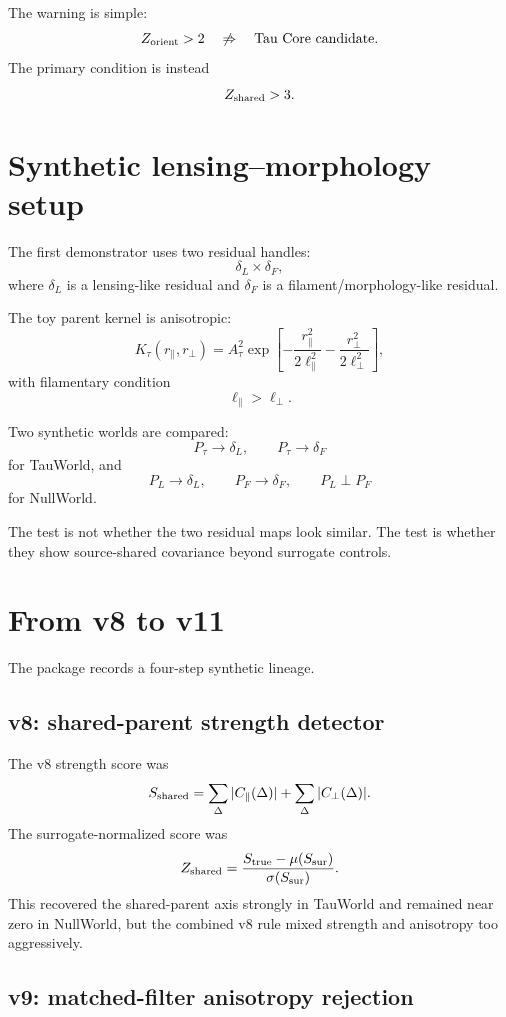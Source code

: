 \documentclass[12pt]{article}
\begin{document}
The warning is simple:
\[
  Z_{\rm orient}>2
  \quad\not\Rightarrow\quad
  \text{Tau Core candidate}.
\]
The primary condition is instead
\[
  Z_{\rm shared}>3.
\]

\section{Synthetic lensing--morphology setup}

The first demonstrator uses two residual handles:
\[
  \delta_L \times \delta_F,
\]
where \(\delta_L\) is a lensing-like residual and \(\delta_F\) is a
filament/morphology-like residual.

The toy parent kernel is anisotropic:
\[
  K_{\tau}(r_{\parallel},r_{\perp})
  =
  A_{\tau}^2
  \exp\left[
  -\frac{r_{\parallel}^2}{2\ell_{\parallel}^2}
  -\frac{r_{\perp}^2}{2\ell_{\perp}^2}
  \right],
  \label{eq:parent-kernel}
\]
with filamentary condition
\[
  \ell_{\parallel}>\ell_{\perp}.
\]

Two synthetic worlds are compared:
\[
  P_{\tau}\to\delta_L,\qquad P_{\tau}\to\delta_F
\]
for TauWorld, and
\[
  P_L\to\delta_L,\qquad P_F\to\delta_F,\qquad P_L\perp P_F
\]
for NullWorld.

The test is not whether the two residual maps look similar.  The test is
whether they show source-shared covariance beyond surrogate controls.

\section{From v8 to v11}

The package records a four-step synthetic lineage.

\subsection{v8: shared-parent strength detector}

The v8 strength score was
\[
  S_{\rm shared}
  =
  \sum_{\Delta}|C_{\parallel}(\Delta)|
  +
  \sum_{\Delta}|C_{\perp}(\Delta)|.
\]
The surrogate-normalized score was
\[
  Z_{\rm shared}
  =
  \frac{S_{\rm true}-\mu(S_{\rm sur})}
  {\sigma(S_{\rm sur})}.
\]
This recovered the shared-parent axis strongly in TauWorld and remained near
zero in NullWorld, but the combined v8 rule mixed strength and anisotropy too
aggressively.

\subsection{v9: matched-filter anisotropy rejection}
\end{document}
